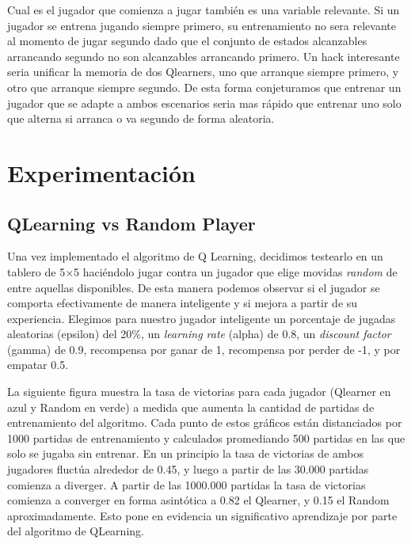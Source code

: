 \documentclass[10pt,a4paper]{article}
\begin{document}
Cual es el jugador que comienza a jugar también es una variable relevante. Si un jugador se entrena jugando siempre primero, su entrenamiento no sera relevante al momento de jugar segundo dado que el conjunto de estados alcanzables arrancando segundo no son alcanzables arrancando primero. Un hack interesante seria unificar la memoria de dos Qlearners, uno que arranque siempre primero, y otro que arranque siempre segundo. De esta forma conjeturamos que entrenar un jugador que se adapte a ambos escenarios seria mas rápido que entrenar uno solo que alterna si arranca o va segundo de forma aleatoria.

\pagebreak

\section{Experimentación}

\subsection{QLearning vs Random Player}

Una vez implementado el algoritmo de Q Learning, decidimos testearlo en un tablero de 5$\times$5 haciéndolo jugar contra un jugador que elige movidas \textit{random} de entre aquellas disponibles. De esta manera podemos observar si el jugador se comporta efectivamente de manera inteligente y si mejora a partir de su experiencia. Elegimos para nuestro jugador inteligente un porcentaje de jugadas aleatorias (epsilon) del 20\%, un \textit{learning rate} (alpha) de 0.8, un \textit{discount factor} (gamma) de 0.9, recompensa por ganar de 1, recompensa por perder de -1, y por empatar 0.5.

La siguiente figura muestra la tasa de victorias para cada jugador (Qlearner en azul y Random en verde) a medida que aumenta la cantidad de partidas de entrenamiento del algoritmo. Cada punto de estos gráficos están distanciados por 1000 partidas de entrenamiento y calculados promediando 500 partidas en las que solo se jugaba sin entrenar. En un principio la tasa de victorias de ambos jugadores fluctúa alrededor de 0.45, y luego a partir de las 30.000 partidas comienza a diverger. A partir de las 1000.000 partidas la tasa de victorias comienza a converger en forma asintótica a 0.82 el Qlearner, y 0.15 el Random aproximadamente. Esto pone en evidencia un significativo aprendizaje por parte del algoritmo de QLearning.
\end{document}

